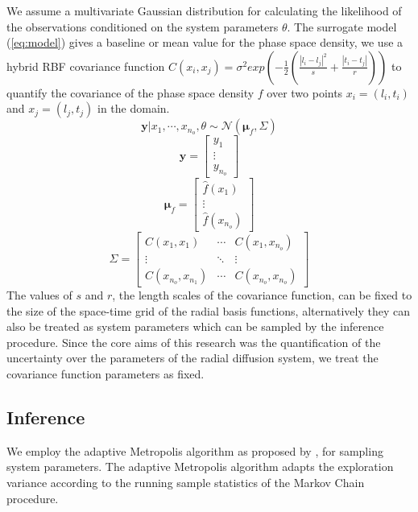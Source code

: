 We assume a multivariate Gaussian distribution for calculating the likelihood of 
the observations conditioned on the system parameters $\theta$. The surrogate model (\cref{eq:model}) 
gives a baseline or mean value for the phase space density, we use a hybrid RBF covariance function 
$C(x_{i}, x_{j}) = \sigma^2 exp(-\frac{1}{2} (\frac{|l_i - l_j|^2}{s} + \frac{|t_i - t_j|}{r}))$ to quantify 
the covariance of the phase space density $f$ over two points $x_i = (l_i, t_i)$ and $x_j = (l_j, t_j)$ in the domain. 
%
\begin{equation}
\mathbf{y} | x_1, \cdots, x_{n_o}, \theta \sim \mathcal{N} \left(\mathbf{\mu}_f, \Sigma \right )
\end{equation}
%
\begin{equation}
\mathbf{y} = \begin{bmatrix}
y_1\\ 
\vdots\\ 
y_{n_o}
\end{bmatrix}
\end{equation}
%
\begin{equation}
  \mathbf{\mu}_f = \begin{bmatrix}
\hat{f}(x_1)\\ 
\vdots\\ 
\hat{f}(x_{n_o})
\end{bmatrix}
\end{equation}
%
\begin{equation}
    \Sigma = \begin{bmatrix}
C(x_1, x_1) & \cdots  & C(x_1, x_{n_o})\\ 
\vdots & \ddots & \vdots\\ 
C(x_{n_o}, x_{n_{1}}) & \cdots  & C(x_{n_o}, x_{n_{o}})
\end{bmatrix}
\end{equation}
%
The values of $s$ and $r$, the length scales of the covariance function, 
can be fixed to the size of the space-time grid of the radial basis functions, 
alternatively they can also be treated as system parameters which can be sampled 
by the inference procedure. Since the core aims of this research was the quantification
of the uncertainty over the parameters of the radial diffusion system, 
we treat the covariance function parameters as fixed.

\subsection{Inference}

We employ the adaptive Metropolis algorithm as proposed by \citet{haario2001}, for sampling
system parameters. The adaptive Metropolis algorithm adapts the exploration variance according
to the running sample statistics of the Markov Chain procedure.


